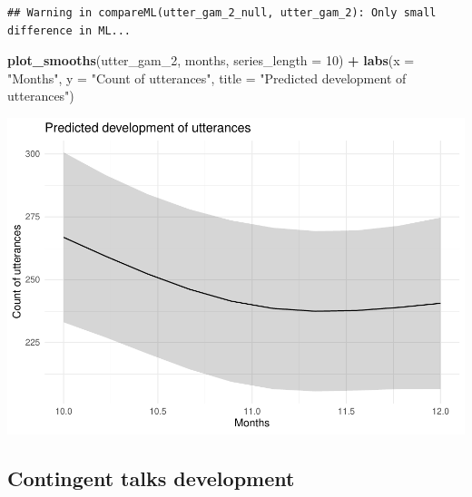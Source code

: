 \documentclass[]{article}
\newenvironment{Shaded}{\begin{snugshade}}{\end{snugshade}}
\newcommand{\DataTypeTok}[1]{\textcolor[rgb]{0.13,0.29,0.53}{#1}}
\newcommand{\DecValTok}[1]{\textcolor[rgb]{0.00,0.00,0.81}{#1}}
\newcommand{\FloatTok}[1]{\textcolor[rgb]{0.00,0.00,0.81}{#1}}
\newcommand{\KeywordTok}[1]{\textcolor[rgb]{0.13,0.29,0.53}{\textbf{#1}}}
\newcommand{\NormalTok}[1]{#1}
\newcommand{\OperatorTok}[1]{\textcolor[rgb]{0.81,0.36,0.00}{\textbf{#1}}}
\newcommand{\StringTok}[1]{\textcolor[rgb]{0.31,0.60,0.02}{#1}}
\begin{document}
\begin{verbatim}
## Warning in compareML(utter_gam_2_null, utter_gam_2): Only small difference in ML...
\end{verbatim}

\begin{Shaded}
\begin{Highlighting}[]
\KeywordTok{plot_smooths}\NormalTok{(utter_gam_}\DecValTok{2}\NormalTok{, months, }\DataTypeTok{series_length =} \DecValTok{10}\NormalTok{) }\OperatorTok{+}
\StringTok{  }\KeywordTok{labs}\NormalTok{(}\DataTypeTok{x =} \StringTok{"Months"}\NormalTok{, }\DataTypeTok{y =} \StringTok{"Count of utterances"}\NormalTok{, }\DataTypeTok{title =} \StringTok{"Predicted development of utterances"}\NormalTok{)}
\end{Highlighting}
\end{Shaded}

\includegraphics{supplement_files/figure-latex/utter-gam-2-plot-1.pdf}

\hypertarget{contingent-talks-development}{%
\subsection{Contingent talks
development}\label{contingent-talks-development}}

\begin{Shaded}
\end{Shaded}
\end{document}
